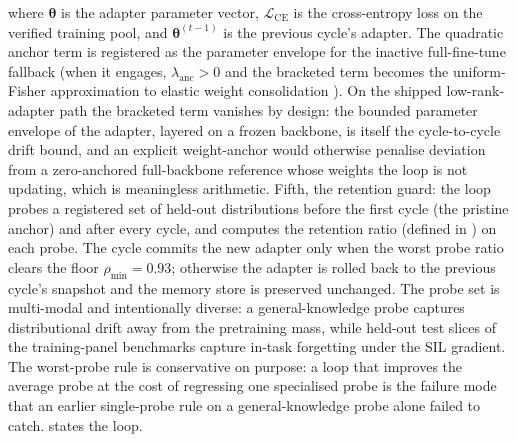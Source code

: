 where $\boldsymbol{\theta}$ is the adapter parameter vector, $\mathcal{L}_{\mathrm{CE}}$ is the cross-entropy loss on the verified training pool, and $\boldsymbol{\theta}^{(t-1)}$ is the previous cycle's adapter. The quadratic anchor term is registered as the parameter envelope for the inactive full-fine-tune fallback (when it engages, $\lambda_{\text{anc}}>0$ and the bracketed term becomes the uniform-Fisher approximation to elastic weight consolidation \cite{doi:10.1073/pnas.1611835114}). On the shipped low-rank-adapter path the bracketed term vanishes by design: the bounded parameter envelope of the adapter, layered on a frozen backbone, is itself the cycle-to-cycle drift bound, and an explicit weight-anchor would otherwise penalise deviation from a zero-anchored full-backbone reference whose weights the loop is not updating, which is meaningless arithmetic. Fifth, the retention guard: the loop probes a registered set of held-out distributions before the first cycle (the pristine anchor) and after every cycle, and computes the retention ratio (defined in ) on each probe. The cycle commits the new adapter only when the worst probe ratio clears the floor $\rho_{\min} = 0.93$; otherwise the adapter is rolled back to the previous cycle's snapshot and the memory store is preserved unchanged. The probe set is multi-modal and intentionally diverse: a general-knowledge probe captures distributional drift away from the pretraining mass, while held-out test slices of the training-panel benchmarks capture in-task forgetting under the SIL gradient. The worst-probe rule is conservative on purpose: a loop that improves the average probe at the cost of regressing one specialised probe is the failure mode that an earlier single-probe rule on a general-knowledge probe alone failed to catch.  states the loop.

